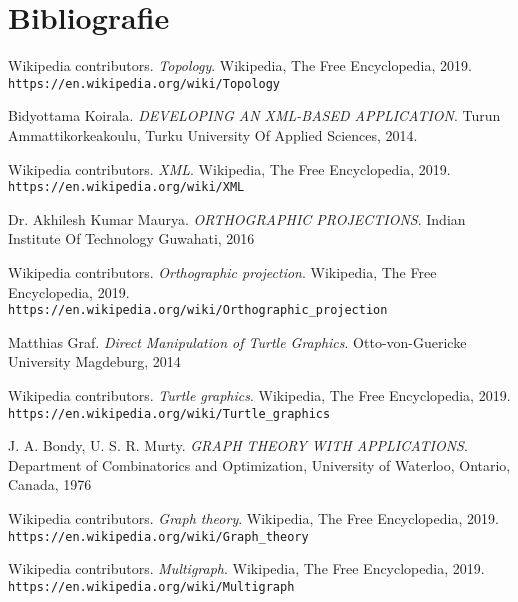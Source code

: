\newpage
\section{Bibliografie}


\begin{thebibliography}{9}

    Wikipedia contributors. 
    \textit{Topology}. 
    Wikipedia, The Free Encyclopedia, 2019. 
    \\\texttt{https://en.wikipedia.org/wiki/Topology}

    Bidyottama Koirala.
    \textit{DEVELOPING AN XML-BASED APPLICATION}.  
    Turun Ammattikorkeakoulu, Turku University Of Applied Sciences, 2014.
     
    Wikipedia contributors. 
    \textit{XML}. 
    Wikipedia, The Free Encyclopedia, 2019. 
    \\\texttt{https://en.wikipedia.org/wiki/XML}

    Dr. Akhilesh Kumar Maurya.
    \textit{ORTHOGRAPHIC PROJECTIONS}.
    Indian Institute Of Technology Guwahati, 2016
    
    Wikipedia contributors. 
    \textit{Orthographic projection}. 
    Wikipedia, The Free Encyclopedia, 2019.
    \\\texttt{https://en.wikipedia.org/wiki/Orthographic\_projection}

    Matthias Graf.
    \textit{Direct Manipulation of Turtle Graphics}.
    Otto-von-Guericke University Magdeburg, 2014

    Wikipedia contributors. 
    \textit{Turtle graphics}. 
    Wikipedia, The Free Encyclopedia, 2019. 
    \\\texttt{https://en.wikipedia.org/wiki/Turtle\_graphics}

    J. A. Bondy, U. S. R. Murty.
    \textit{GRAPH THEORY WITH APPLICATIONS}. 
    Department of Combinatorics and Optimization, University of Waterloo, Ontario, Canada, 1976
    
    Wikipedia contributors. 
    \textit{Graph theory}. 
    Wikipedia, The Free Encyclopedia, 2019.
    \\\texttt{https://en.wikipedia.org/wiki/Graph\_theory}
    
    Wikipedia contributors. 
    \textit{Multigraph}. 
    Wikipedia, The Free Encyclopedia, 2019.
    \\\texttt{https://en.wikipedia.org/wiki/Multigraph}


\end{thebibliography}
